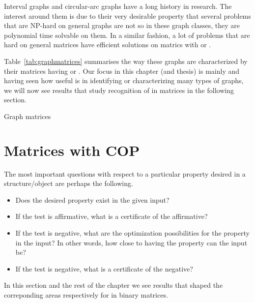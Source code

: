 Interval graphs and circular-arc graphs have a long history in
research. The interest around them is due to their very desirable
property that several problems that are NP-hard on general graphs are not so in these graph
classes, \ie they are polynomial time solvable on them. In a similar
fashion, a lot of problems that are hard on general matrices have
efficient solutions on matrics with \COP or \CROP \cite[more citations
pg.\,33]{d08phd}. 

Table~\ref{tab:graphmatrices} summarises the way these graphs are
characterized by their matrices having \COP or \CROP.
Our focus in this chapter (and thesis) is mainly \COP and 
having seen how useful \COP is in identifying or characterizing many
types of graphs, we will now see results that study recognition of \COP
in matrices in the following section.


\begin{table}[htbp]
  \centering
 \caption{\figtabsize Graph matrices }
  \label{tab:graphmatrices}
\end{table}


\section{Matrices with COP}
\label{sec:surveycoptest}

The most important questions with respect to a particular 
property desired in a structure/object are perhaps the following.
\begin{itemize}%
\singlespacing
\item Does the desired property exist in the given input?
\item If the test is affirmative, what is a certificate of the affirmative?
\item If the test is negative, what are the optimization possibilities
  for the property in the input? In other words, how close to having the
  property can the input be?
\item If the test is negative, what is a certificate of the negative?
\end{itemize}

In this section and the rest of the chapter we see results that shaped the
correponding areas respectively for \cop in binary matrices.

